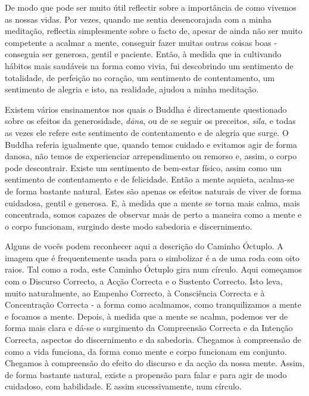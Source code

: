 De modo que pode ser muito útil reflectir sobre a importância de como
vivemos as nossas vidas. Por vezes, quando me sentia desencorajada com a
minha meditação, reflectia simplesmente sobre o facto de, apesar de
ainda não ser muito competente a acalmar a mente, conseguir fazer muitas
outras coisas boas - conseguia ser generosa, gentil e paciente. Então, à
medida que ia cultivando hábitos mais saudáveis na forma como vivia, fui
descobrindo um sentimento de totalidade, de perfeição no coração, um
sentimento de contentamento, um sentimento de alegria e isto, na
realidade, ajudou a minha meditação.

Existem vários ensinamentos nos quais o Buddha é directamente
questionado sobre os efeitos da generosidade, \emph{dāna}, ou de se
seguir os preceitos, \emph{sīla}, e todas as vezes ele refere este
sentimento de contentamento e de alegria que surge. O Buddha referia
igualmente que, quando temos cuidado e evitamos agir de forma danosa,
não temos de experienciar arrependimento ou remorso e, assim, o corpo
pode descontrair. Existe um sentimento de \mbox{bem-estar} físico, assim como
um sentimento de contentamento e de felicidade. Então a mente aquieta,
acalma-se de forma bastante natural. Estes são apenas os efeitos
naturais de viver de forma cuidadosa, gentil e generosa. E, à medida que
a mente se torna mais calma, mais concentrada, somos capazes de observar
mais de perto a maneira como a mente e o corpo funcionam, surgindo deste
modo sabedoria e discernimento.

Alguns de vocês podem reconhecer aqui a descrição do Caminho Óctuplo. A
imagem que é frequentemente usada para o simbolizar é a de uma roda com
oito raios. Tal como a roda, este Caminho Óctuplo gira num círculo. Aqui
começamos com o Discurso Correcto, a Acção Correcta e o Sustento
Correcto. Isto leva, muito naturalmente, ao Empenho Correcto, à
Consciência Correcta e à Concentração Correcta - a forma como acalmamos,
como tranquilizamos a mente e focamos a mente. Depois, à medida que a
mente se acalma, podemos ver de forma mais clara e dá-se o surgimento da
Compreensão Correcta e da Intenção Correcta, aspectos do discernimento e
da sabedoria. Chegamos à compreensão de como a vida funciona, da forma
como mente e corpo funcionam em conjunto. Chegamos à compreensão do
efeito do discurso e da acção da nossa mente. Assim, de forma bastante
natural, existe a propensão para falar e para agir de modo cuidadoso,
com habilidade. E assim sucessivamente, num círculo.

